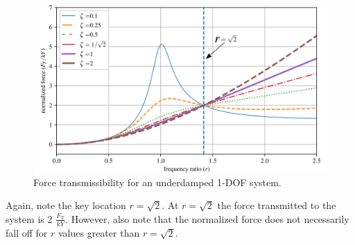 \documentclass[12pt,letter]{article}
\numberwithin{ex}{section} %
\numberwithin{re}{section} %
\numberwithin{vcs}{section} %
\begin{document}
				\begin{figure}[H]
					\centering
					\includegraphics[]{../figures/base_excitation_force_transmissibility.png}
					\caption{Force transmissibility for an underdamped 1-DOF system.}
				\end{figure}
				Again, note the key location $r=\sqrt{2}$. At $r=\sqrt{2}$ the force transmitted to the system is 2 $\frac{F_\text{T}}{kY}$. However, also note that the normalized force does not necessarily fall off for $r$ values greater than $r=\sqrt{2}$.  
\end{document}
